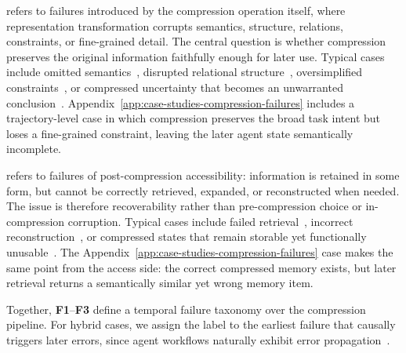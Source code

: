 \noindent\textbf{\ftwo} refers to failures introduced by the compression operation itself, where representation transformation corrupts semantics, structure, relations, constraints, or fine-grained detail. The central question is whether compression preserves the original information faithfully enough for later use. Typical cases include omitted semantics~\citep{chen2026halumemevaluatinghallucinationsmemory, yang2026staticsummarizationproactivememory}, disrupted relational structure~\citep{wu2026contextweaverselectivedependencystructuredmemory}, oversimplified constraints~\citep{chen2026halumemevaluatinghallucinationsmemory, liu2025contexttoolcontextmanagement}, or compressed uncertainty that becomes an unwarranted conclusion~\citep{yang2026staticsummarizationproactivememory}. Appendix~\ref{app:case-studies-compression-failures} includes a trajectory-level case in which compression preserves the broad task intent but loses a fine-grained constraint, leaving the later agent state semantically incomplete.

\noindent\textbf{\fthree} refers to failures of post-compression accessibility: information is retained in some form, but cannot be correctly retrieved, expanded, or reconstructed when needed. The issue is therefore recoverability rather than pre-compression choice or in-compression corruption. Typical cases include failed retrieval~\citep{li2026ocrmemoryopticalcontextretrieval, zeng2026kvcachecentric, chen2026halumemevaluatinghallucinationsmemory}, incorrect reconstruction~\citep{chen2026halumemevaluatinghallucinationsmemory}, or compressed states that remain storable yet functionally unusable~\citep{li2026ocrmemoryopticalcontextretrieval, zeng2026kvcachecentric}. The Appendix~\ref{app:case-studies-compression-failures} case makes the same point from the access side: the correct compressed memory exists, but later retrieval returns a semantically similar yet wrong memory item.

Together, \textbf{F1}–\textbf{F3} define a temporal failure taxonomy over the compression pipeline. For hybrid cases, we assign the label to the earliest failure that causally triggers later errors, since agent workflows naturally exhibit error propagation~\citep{wang2024survey}.



